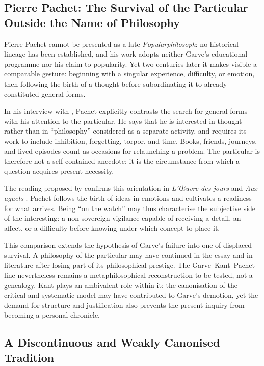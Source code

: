 \documentclass[11pt,a4paper]{article}
\begin{document}
\subsection{Pierre Pachet: The Survival of the Particular Outside the Name of Philosophy}

Pierre Pachet cannot be presented as a late \emph{Popularphilosoph}: no
historical lineage has been established, and his work adopts neither Garve's
educational programme nor his claim to popularity. Yet two centuries later it
makes visible a comparable gesture: beginning with a singular experience,
difficulty, or emotion, then following the birth of a thought before
subordinating it to already constituted general forms.

In his interview with \textcite{salgas1991pachet}, Pachet explicitly contrasts
the search for general forms with his attention to the particular. He says that
he is interested in thought rather than in ``philosophy'' considered as a
separate activity, and requires its work to include inhibition, forgetting,
torpor, and time. Books, friends, journeys, and lived episodes count as occasions
for relaunching a problem. The particular is therefore not a self-contained
anecdote: it is the circumstance from which a question acquires present
necessity.

The reading proposed by \textcite{rueff2016promontoire} confirms this orientation
in \emph{L'Œuvre des jours} and \emph{Aux aguets}
\parencite{pachet1999oeuvre,pachet2002aguets}. Pachet follows the birth of ideas
in emotions and cultivates a readiness for what arrives. Being ``on the watch''
may thus characterise the subjective side of the interesting: a non-sovereign
vigilance capable of receiving a detail, an affect, or a difficulty before
knowing under which concept to place it.

This comparison extends the hypothesis of Garve's failure into one of displaced
survival. A philosophy of the particular may have continued in the essay and in
literature after losing part of its philosophical prestige. The
Garve--Kant--Pachet line nevertheless remains a metaphilosophical reconstruction
to be tested, not a genealogy. Kant plays an ambivalent role within it: the
canonisation of the critical and systematic model may have contributed to
Garve's demotion, yet the demand for structure and justification also prevents
the present inquiry from becoming a personal chronicle.

\subsection{A Discontinuous and Weakly Canonised Tradition}
\end{document}

